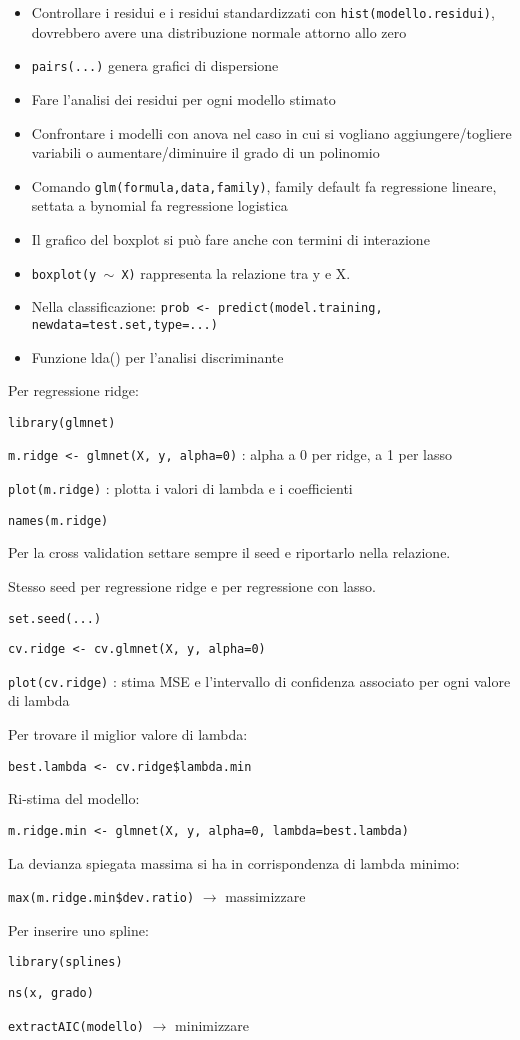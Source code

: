 \begin{itemize}
 \item Controllare i residui e i residui standardizzati con
\texttt{hist(modello.residui)}, dovrebbero avere una distribuzione
normale attorno allo zero
 \item \texttt{pairs(...)} genera grafici di dispersione
 \item Fare l'analisi dei residui per ogni modello stimato
 \item Confrontare i modelli con anova nel caso in cui si vogliano
aggiungere/togliere variabili o aumentare/diminuire il grado di un polinomio
 \item Comando \texttt{glm(formula,data,family)}, family default fa
regressione lineare, settata a bynomial fa regressione
logistica
 \item Il grafico del boxplot si può fare anche con termini di interazione
 \item \texttt{boxplot(y $\sim$ X)} rappresenta la relazione tra y e X.
 \item Nella classificazione: \texttt{prob <- predict(model.training,
newdata=test.set,type=...)}
 \item Funzione lda() per l'analisi discriminante
\end{itemize}

Per regressione ridge:

\texttt{library(glmnet)}

\texttt{m.ridge <- glmnet(X, y, alpha=0)} : alpha a 0 per ridge, a 1 per lasso

\texttt{plot(m.ridge)} : plotta i valori di lambda e i coefficienti

\texttt{names(m.ridge)}

Per la cross validation settare sempre il seed e riportarlo nella relazione.

Stesso seed per regressione ridge e per regressione con lasso.

\texttt{set.seed(...)}

\texttt{cv.ridge <- cv.glmnet(X, y, alpha=0)}

\texttt{plot(cv.ridge)} : stima MSE e l'intervallo di confidenza associato per
ogni valore di lambda

Per trovare il miglior valore di lambda:

\texttt{best.lambda <- cv.ridge\$lambda.min}

Ri-stima del modello:

\texttt{m.ridge.min <- glmnet(X, y, alpha=0, lambda=best.lambda)}

La devianza spiegata massima si ha in corrispondenza di lambda minimo:

\texttt{max(m.ridge.min\$dev.ratio)} $\rightarrow$ massimizzare

Per inserire uno spline:

\texttt{library(splines)}

\texttt{ns(x, grado)}

\texttt{extractAIC(modello)} $\rightarrow$ minimizzare
